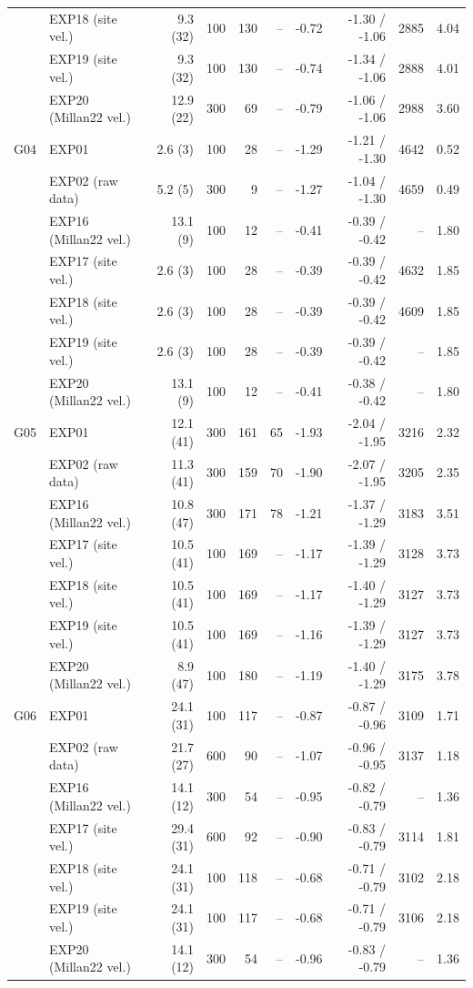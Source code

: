 \begin{tabular}{llrrrrrrrr}
 & EXP18 (site vel.) & 9.3 (32) & 100 & 130 & -- & -0.72 & -1.30 / -1.06 & 2885 & 4.04 \\
 & EXP19 (site vel.) & 9.3 (32) & 100 & 130 & -- & -0.74 & -1.34 / -1.06 & 2888 & 4.01 \\
 & EXP20 (Millan22 vel.) & 12.9 (22) & 300 & 69 & -- & -0.79 & -1.06 / -1.06 & 2988 & 3.60 \\
\midrule
G04 & EXP01 & 2.6 (3) & 100 & 28 & -- & -1.29 & -1.21 / -1.30 & 4642 & 0.52 \\
 & EXP02 (raw data) & 5.2 (5) & 300 & 9 & -- & -1.27 & -1.04 / -1.30 & 4659 & 0.49 \\
 & EXP16 (Millan22 vel.) & 13.1 (9) & 100 & 12 & -- & -0.41 & -0.39 / -0.42 & -- & 1.80 \\
 & EXP17 (site vel.) & 2.6 (3) & 100 & 28 & -- & -0.39 & -0.39 / -0.42 & 4632 & 1.85 \\
 & EXP18 (site vel.) & 2.6 (3) & 100 & 28 & -- & -0.39 & -0.39 / -0.42 & 4609 & 1.85 \\
 & EXP19 (site vel.) & 2.6 (3) & 100 & 28 & -- & -0.39 & -0.39 / -0.42 & -- & 1.85 \\
 & EXP20 (Millan22 vel.) & 13.1 (9) & 100 & 12 & -- & -0.41 & -0.38 / -0.42 & -- & 1.80 \\
\midrule
G05 & EXP01 & 12.1 (41) & 300 & 161 & 65 & -1.93 & -2.04 / -1.95 & 3216 & 2.32 \\
 & EXP02 (raw data) & 11.3 (41) & 300 & 159 & 70 & -1.90 & -2.07 / -1.95 & 3205 & 2.35 \\
 & EXP16 (Millan22 vel.) & 10.8 (47) & 300 & 171 & 78 & -1.21 & -1.37 / -1.29 & 3183 & 3.51 \\
 & EXP17 (site vel.) & 10.5 (41) & 100 & 169 & -- & -1.17 & -1.39 / -1.29 & 3128 & 3.73 \\
 & EXP18 (site vel.) & 10.5 (41) & 100 & 169 & -- & -1.17 & -1.40 / -1.29 & 3127 & 3.73 \\
 & EXP19 (site vel.) & 10.5 (41) & 100 & 169 & -- & -1.16 & -1.39 / -1.29 & 3127 & 3.73 \\
 & EXP20 (Millan22 vel.) & 8.9 (47) & 100 & 180 & -- & -1.19 & -1.40 / -1.29 & 3175 & 3.78 \\
\midrule
G06 & EXP01 & 24.1 (31) & 100 & 117 & -- & -0.87 & -0.87 / -0.96 & 3109 & 1.71 \\
 & EXP02 (raw data) & 21.7 (27) & 600 & 90 & -- & -1.07 & -0.96 / -0.95 & 3137 & 1.18 \\
 & EXP16 (Millan22 vel.) & 14.1 (12) & 300 & 54 & -- & -0.95 & -0.82 / -0.79 & -- & 1.36 \\
 & EXP17 (site vel.) & 29.4 (31) & 600 & 92 & -- & -0.90 & -0.83 / -0.79 & 3114 & 1.81 \\
 & EXP18 (site vel.) & 24.1 (31) & 100 & 118 & -- & -0.68 & -0.71 / -0.79 & 3102 & 2.18 \\
 & EXP19 (site vel.) & 24.1 (31) & 100 & 117 & -- & -0.68 & -0.71 / -0.79 & 3106 & 2.18 \\
 & EXP20 (Millan22 vel.) & 14.1 (12) & 300 & 54 & -- & -0.96 & -0.83 / -0.79 & -- & 1.36 \\
\bottomrule
\end{tabular}
